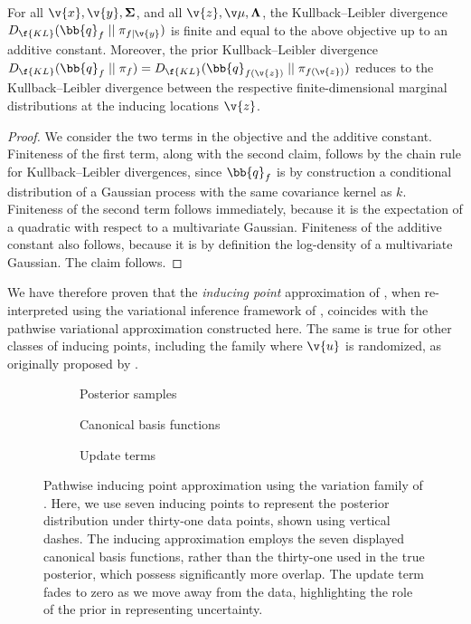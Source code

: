 \documentclass[11pt]{book}
\begin{document}
\begin{proposition}
For all $\v{x},\v{y},\m\Sigma$, and all $\v{z},\v\mu,\m\Lambda$, the Kullback--Leibler divergence $D_{\f{KL}}(\bb{q}_f \from \pi_{f \given\v{y}})$ is finite and equal to the above objective up to an additive constant.
Moreover, the prior Kullback--Leibler divergence $D_{\f{KL}}(\bb{q}_f \from \pi_f) = D_{\f{KL}}(\bb{q}_{f(\v{z})} \from \pi_{f(\v{z})})$ reduces to the Kullback--Leibler divergence between the respective finite-dimensional marginal distributions at the inducing locations $\v{z}$.
\end{proposition}

\begin{proof}
We consider the two terms in the objective and the additive constant.
\1 Finiteness of the first term, along with the second claim, follows by the chain rule for Kullback--Leibler divergences, since $\bb{q}_f$ is by construction a conditional distribution of a Gaussian process with the same covariance kernel as $k$.
\2 Finiteness of the second term follows immediately, because it is the expectation of a quadratic with respect to a multivariate Gaussian.
\3 Finiteness of the additive constant also follows, because it is by definition the log-density of a multivariate Gaussian.
\0 
The claim follows. 
\end{proof}

We have therefore proven that the \emph{inducing point} approximation of \textcite{opper09}, when re-interpreted using the variational inference framework of \textcite{titsias09}, coincides with the pathwise variational approximation constructed here.
The same is true for other classes of inducing points, including the family where $\v{u}$ is randomized, as originally proposed by \textcite{titsias09}.

\begin{figure}
\begin{subfigure}{\textwidth}

\caption{Posterior samples}
\end{subfigure}
\begin{subfigure}{0.49\textwidth}

\caption{Canonical basis functions}
\end{subfigure}
\begin{subfigure}{0.49\textwidth}

\caption{Update terms}
\end{subfigure}
\caption{Pathwise inducing point approximation using the variation family of \textcite{titsias09}. Here, we use seven inducing points to represent the posterior distribution under thirty-one data points, shown using vertical dashes. 
The inducing approximation employs the seven displayed canonical basis functions, rather than the thirty-one used in the true posterior, which possess significantly more overlap.
The update term fades to zero as we move away from the data, highlighting the role of the prior in representing uncertainty.}
\label{fig:gp-inducing}
\end{figure}
\end{document}
